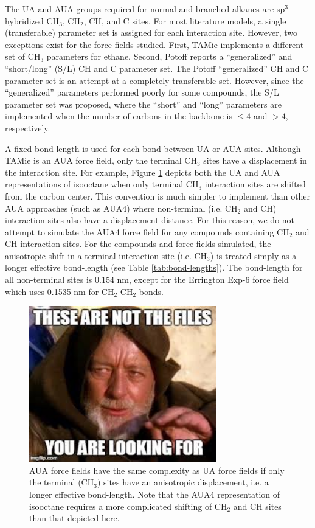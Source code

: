 \documentclass[preprint,review,12pt]{elsarticle}
\begin{document}
	The UA and AUA groups required for normal and branched alkanes are sp$^3$ hybridized CH$_3$, CH$_2$, CH, and C sites. For most literature models, a single (transferable) parameter set is assigned for each interaction site. However, two exceptions exist for the force fields studied. First, TAMie implements a different set of CH$_3$ parameters for ethane. Second, Potoff reports a ``generalized'' and ``short/long'' (S/L) CH and C parameter set. The Potoff ``generalized'' CH and C parameter set is an attempt at a completely transferable set. However, since the ``generalized'' parameters performed poorly for some compounds, the S/L parameter set was proposed, where the ``short'' and ``long'' parameters are implemented when the number of carbons in the backbone is $\le 4$ and $> 4$, respectively. 
	
	A fixed bond-length is used for each bond between UA or AUA sites. Although TAMie is an AUA force field, only the terminal CH$_3$ sites have a displacement in the interaction site. For example, Figure \ref{fig:AUA_isooctane} depicts both the UA and AUA representations of isooctane when only terminal CH$_3$ interaction sites are shifted from the carbon center. This convention is much simpler to implement than other AUA approaches (such as AUA4) where non-terminal (i.e. CH$_2$ and CH) interaction sites also have a displacement distance. For this reason, 
	we do not attempt to simulate the AUA4 force field for any compounds containing CH$_2$ and CH interaction sites. For the compounds and force fields simulated, the anisotropic shift in a terminal interaction site (i.e. CH$_3$) is treated simply as a longer effective bond-length (see Table \ref{tab:bond-lengths}). The bond-length for all non-terminal sites is 0.154 nm, except for the Errington Exp-6 force field which uses 0.1535 nm for CH$_2$-CH$_2$ bonds.
	
	\begin{figure}[htb!]
		\centering
		\includegraphics[width=3.2in]{empty_figure.jpg}
		\caption{AUA force fields have the same complexity as UA force fields if only the terminal (CH$_3$) sites have an anisotropic displacement, i.e. a longer effective bond-length. Note that the AUA4 representation of isooctane requires a more complicated shifting of CH$_2$ and CH sites than that depicted here.}
		\label{fig:AUA_isooctane}
	\end{figure}
	
\end{document}
